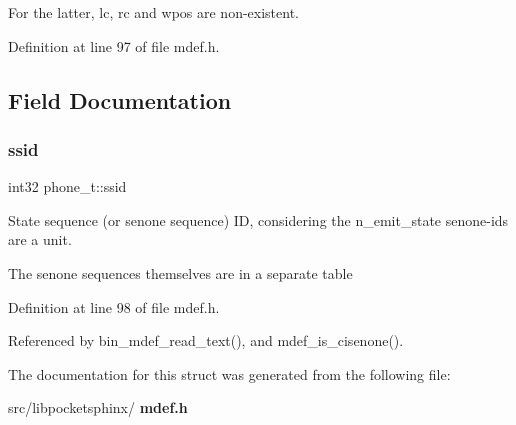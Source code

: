 For the latter, lc, rc and wpos are non-\/existent. 

Definition at line 97 of file mdef.\+h.



\subsection{Field Documentation}
\mbox{\label{structphone__t_af2f31836358c1c29c38a361b3923b859}} 
\subsubsection{ssid}
{\footnotesize\ttfamily int32 phone\+\_\+t\+::ssid}



State sequence (or senone sequence) ID, considering the n\+\_\+emit\+\_\+state senone-\/ids are a unit. 

The senone sequences themselves are in a separate table 

Definition at line 98 of file mdef.\+h.



Referenced by bin\+\_\+mdef\+\_\+read\+\_\+text(), and mdef\+\_\+is\+\_\+cisenone().



The documentation for this struct was generated from the following file\+:\begin{DoxyCompactItemize}
\item 
src/libpocketsphinx/\textbf{ mdef.\+h}\end{DoxyCompactItemize}

